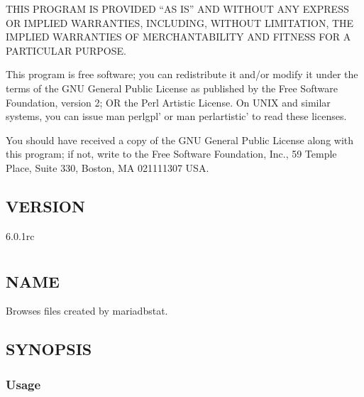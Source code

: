 \documentclass[letterpaper,10pt,english]{sphinxmanual}
\begin{document}
\sphinxAtStartPar
THIS PROGRAM IS PROVIDED “AS IS” AND WITHOUT ANY EXPRESS OR IMPLIED
WARRANTIES, INCLUDING, WITHOUT LIMITATION, THE IMPLIED WARRANTIES OF
MERCHANTABILITY AND FITNESS FOR A PARTICULAR PURPOSE.

\sphinxAtStartPar
This program is free software; you can redistribute it and/or modify it under
the terms of the GNU General Public License as published by the Free Software
Foundation, version 2; OR the Perl Artistic License.  On UNIX and similar
systems, you can issue \textasciigrave{}man perlgpl’ or \textasciigrave{}man perlartistic’ to read these
licenses.

\sphinxAtStartPar
You should have received a copy of the GNU General Public License along with
this program; if not, write to the Free Software Foundation, Inc., 59 Temple
Place, Suite 330, Boston, MA  02111\sphinxhyphen{}1307  USA.


\section{VERSION}
\label{\detokenize{mariadb-stat:version}}
\sphinxAtStartPar
{} 6.0.1rc


\chapter{}
\label{\detokenize{mariadb-stat-browser:mariadb-stat-browser}}\label{\detokenize{mariadb-stat-browser::doc}}

\section{NAME}
\label{\detokenize{mariadb-stat-browser:name}}
\sphinxAtStartPar
{} \sphinxhyphen{} Browses files created by mariadb\sphinxhyphen{}stat.


\section{SYNOPSIS}
\label{\detokenize{mariadb-stat-browser:synopsis}}

\subsection{Usage}
\label{\detokenize{mariadb-stat-browser:usage}}
\begin{sphinxVerbatim}[commandchars=\\\{\}]
 
\end{sphinxVerbatim}
\end{document}
